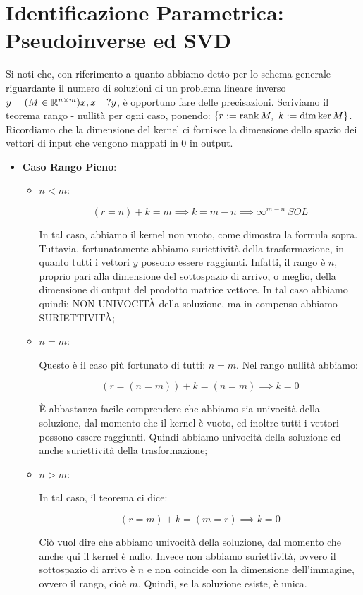\section{Identificazione Parametrica: Pseudoinverse ed SVD}

Si noti che, con riferimento a quanto abbiamo detto per lo schema generale riguardante il numero di soluzioni di un problema lineare inverso $y=(M\in\mathbb{R}^{n\times m})x, x=?y$, è opportuno fare delle precisazioni. Scriviamo il teorema rango - nullità per ogni caso, ponendo: $\{r:=\operatorname{rank}{M},\ k:=\dim\ker{M}\}$. Ricordiamo che la dimensione del kernel ci fornisce la dimensione dello spazio dei vettori di input che vengono mappati in 0 in output.

\begin{itemize}

\item{\textbf{Caso Rango Pieno}}:

\begin{itemize}

\item{$n<m$}:

\[
	(r = n) + k = m \implies k = m-n \implies \infty^{m-n}\ SOL
\]

In tal caso, abbiamo il kernel non vuoto, come dimostra la formula sopra. Tuttavia, fortunatamente abbiamo suriettività della trasformazione, in quanto tutti i vettori $y$ possono essere raggiunti. Infatti, il rango è $n$, proprio pari alla dimensione del sottospazio di arrivo, o meglio, della dimensione di output del prodotto matrice vettore. In tal caso abbiamo quindi: NON UNIVOCIT\`A della soluzione, ma in compenso abbiamo SURIETTIVIT\`A;

\item{$n=m$}:

Questo è il caso più fortunato di tutti: $n=m$. Nel rango nullità abbiamo:

\[
	(r=(n=m)) + k = (n=m) \implies k=0
\]

\`E abbastanza facile comprendere che abbiamo sia univocità della soluzione, dal momento che il kernel è vuoto, ed inoltre tutti i vettori possono essere raggiunti. Quindi abbiamo univocità della soluzione ed anche suriettività della trasformazione;

\item{$n>m$}:

In tal caso, il teorema ci dice:

\[
	(r = m) + k = (m = r) \implies k=0
\]

Ciò vuol dire che abbiamo univocità della soluzione, dal momento che anche qui il kernel è nullo. Invece non abbiamo suriettività, ovvero il sottospazio di arrivo è $n$ e non coincide con la dimensione dell'immagine, ovvero il rango, cioè $m$. Quindi, se la soluzione esiste, è unica.


\end{itemize}
\end{itemize}
